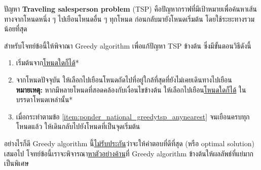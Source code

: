 \question{}

ปัญหา \textbf{Traveling salesperson problem} (TSP) คือปัญหากราฟที่มีเป้าหมายเพื่อค้นหาเส้นทางจากโหนดหนึ่ง ๆ 
ไปเยือนโหนดอื่น ๆ ทุกโหนด ก่อนกลับมายังโหนดเริ่มต้น โดยใช้ระยะทางรวมน้อยที่สุด

สำหรับโจทย์ข้อนี้ให้พิจาณา Greedy algorithm เพื่อแก้ปัญหา TSP ข้างต้น ซึ่งมีขั้นตอนวิธีดังนี้\hrsp%
\begin{enumerate}
\item เริ่มต้นจาก\uline{โหนดใดก็ได้}*
\item \label{item:ponder_national_greedytsp_anynearest} 
    จากโหนดปัจจุบัน ให้เลือกไปเยือนโหนดถัดไปที่อยู่ใกล้ที่สุดที่ยังไม่เคยเดินทางไปเยือน \\
    \textbf{หมายเหตุ:} หากมีหลายโหนดที่สอดคล้องกับเงื่อนไขข้างต้น ให้เลือกไปเยือน\uline{โหนดใดก็ได้}
    ในบรรดาโหนดเหล่านั้น*
\item เมื่อกระทำตามข้อ \ref*{item:ponder_national_greedytsp_anynearest} จนเยือนครบทุกโหนดแล้ว 
    ให้เดินกลับไปยังโหนดที่เป็นจุดเริ่มต้น
\end{enumerate}

อย่างไรก็ดี Greedy algorithm นี้\uline{ไม่รับประกัน}ว่าจะให้คำตอบที่ดีที่สุด (หรือ optimal solution) เสมอไป\;
โจทย์ข้อนี้เราจะพิจารณา\uline{หาตัวอย่างค้าน}ที่ Greedy algorithm ข้างต้นให้ผลลัพธ์ที่แย่มากเป็นพิเศษ 

